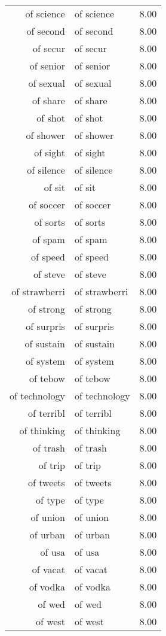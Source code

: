 \begin{table}[ht]
\begin{tabular}{rlr}
  of science & of science & 8.00 \\ 
  of second & of second & 8.00 \\ 
  of secur & of secur & 8.00 \\ 
  of senior & of senior & 8.00 \\ 
  of sexual & of sexual & 8.00 \\ 
  of share & of share & 8.00 \\ 
  of shot & of shot & 8.00 \\ 
  of shower & of shower & 8.00 \\ 
  of sight & of sight & 8.00 \\ 
  of silence & of silence & 8.00 \\ 
  of sit & of sit & 8.00 \\ 
  of soccer & of soccer & 8.00 \\ 
  of sorts & of sorts & 8.00 \\ 
  of spam & of spam & 8.00 \\ 
  of speed & of speed & 8.00 \\ 
  of steve & of steve & 8.00 \\ 
  of strawberri & of strawberri & 8.00 \\ 
  of strong & of strong & 8.00 \\ 
  of surpris & of surpris & 8.00 \\ 
  of sustain & of sustain & 8.00 \\ 
  of system & of system & 8.00 \\ 
  of tebow & of tebow & 8.00 \\ 
  of technology & of technology & 8.00 \\ 
  of terribl & of terribl & 8.00 \\ 
  of thinking & of thinking & 8.00 \\ 
  of trash & of trash & 8.00 \\ 
  of trip & of trip & 8.00 \\ 
  of tweets & of tweets & 8.00 \\ 
  of type & of type & 8.00 \\ 
  of union & of union & 8.00 \\ 
  of urban & of urban & 8.00 \\ 
  of usa & of usa & 8.00 \\ 
  of vacat & of vacat & 8.00 \\ 
  of vodka & of vodka & 8.00 \\ 
  of wed & of wed & 8.00 \\ 
  of west & of west & 8.00 \\ 

\end{tabular}
\end{table}
